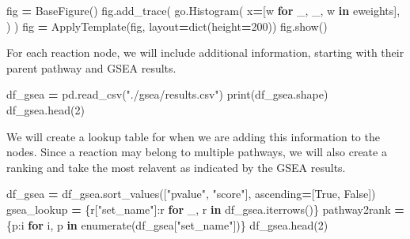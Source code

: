 \documentclass[
]{book}
\newenvironment{Shaded}{\begin{snugshade}}{\end{snugshade}}
\newcommand{\BuiltInTok}[1]{#1}
\newcommand{\ControlFlowTok}[1]{\textcolor[rgb]{0.13,0.29,0.53}{\textbf{#1}}}
\newcommand{\DecValTok}[1]{\textcolor[rgb]{0.00,0.00,0.81}{#1}}
\newcommand{\KeywordTok}[1]{\textcolor[rgb]{0.13,0.29,0.53}{\textbf{#1}}}
\newcommand{\NormalTok}[1]{#1}
\newcommand{\OperatorTok}[1]{\textcolor[rgb]{0.81,0.36,0.00}{\textbf{#1}}}
\newcommand{\StringTok}[1]{\textcolor[rgb]{0.31,0.60,0.02}{#1}}
\newcommand{\VariableTok}[1]{\textcolor[rgb]{0.00,0.00,0.00}{#1}}
\begin{document}
\begin{Shaded}
\begin{Highlighting}[numbers=left,,]
\NormalTok{fig }\OperatorTok{=}\NormalTok{ BaseFigure()}
\NormalTok{fig.add\_trace(}
\NormalTok{    go.Histogram(}
\NormalTok{        x}\OperatorTok{=}\NormalTok{[w }\ControlFlowTok{for}\NormalTok{ \_, \_, w }\KeywordTok{in}\NormalTok{ eweights],}
\NormalTok{    )}
\NormalTok{)}
\NormalTok{fig }\OperatorTok{=}\NormalTok{ ApplyTemplate(fig, layout}\OperatorTok{=}\BuiltInTok{dict}\NormalTok{(height}\OperatorTok{=}\DecValTok{200}\NormalTok{))}
\NormalTok{fig.show()}
\end{Highlighting}
\end{Shaded}

For each reaction node, we will include additional information, starting with their parent pathway and GSEA results.

\begin{Shaded}
\begin{Highlighting}[numbers=left,,]
\NormalTok{df\_gsea }\OperatorTok{=}\NormalTok{ pd.read\_csv(}\StringTok{"./gsea/results.csv"}\NormalTok{)}
\BuiltInTok{print}\NormalTok{(df\_gsea.shape)}
\NormalTok{df\_gsea.head(}\DecValTok{2}\NormalTok{)}
\end{Highlighting}
\end{Shaded}

We will create a lookup table for when we are adding this information to the nodes.
Since a reaction may belong to multiple pathways, we will also create a ranking and take the most relavent as indicated by the GSEA results.

\begin{Shaded}
\begin{Highlighting}[numbers=left,,]
\NormalTok{df\_gsea }\OperatorTok{=}\NormalTok{ df\_gsea.sort\_values([}\StringTok{"pvalue"}\NormalTok{, }\StringTok{"score"}\NormalTok{], ascending}\OperatorTok{=}\NormalTok{[}\VariableTok{True}\NormalTok{, }\VariableTok{False}\NormalTok{])}
\NormalTok{gsea\_lookup }\OperatorTok{=}\NormalTok{ \{r[}\StringTok{"set\_name"}\NormalTok{]:r }\ControlFlowTok{for}\NormalTok{ \_, r }\KeywordTok{in}\NormalTok{ df\_gsea.iterrows()\}}
\NormalTok{pathway2rank }\OperatorTok{=}\NormalTok{ \{p:i }\ControlFlowTok{for}\NormalTok{ i, p }\KeywordTok{in} \BuiltInTok{enumerate}\NormalTok{(df\_gsea[}\StringTok{"set\_name"}\NormalTok{])\}}
\NormalTok{df\_gsea.head(}\DecValTok{2}\NormalTok{)}
\end{Highlighting}
\end{Shaded}
\end{document}
